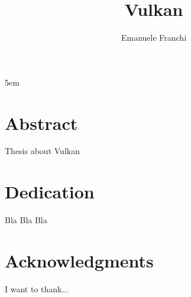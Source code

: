 \documentclass[a4paper]{report}
\author{Emanuele Franchi}
\title{Vulkan}
\begin{document}
\emergencystretch 5em

\maketitle

\chapter*{Abstract}
Thesis about Vulkan

\chapter*{Dedication}
Bla Bla Bla

\chapter*{Acknowledgments}
I want to thank...

\tableofcontents
\listoffigures
\lstlistoflistings














\appendix




\nocite{*}

\end{document}
